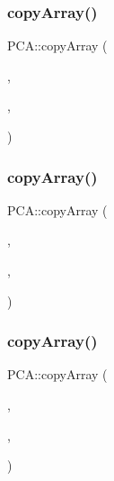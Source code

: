 \hypertarget{namespace_p_c_a_a2b9aa130e94cb88875159aaf23ff8dfb}{}\label{namespace_p_c_a_a2b9aa130e94cb88875159aaf23ff8dfb} 
\subsubsection{\texorpdfstring{copy\+Array()}{copyArray()}\hspace{0.1cm}{\footnotesize\ttfamily [5/8]}}
{\footnotesize\ttfamily P\+C\+A\+::copy\+Array (\begin{DoxyParamCaption}\item[{num\+Sites}]{,  }\item[{\hyperlink{namespace_p_c_a_abf43edb3e63963e603bf8c8ce20abf94}{d}}]{,  }\item[{d\+\_\+in}]{ }\end{DoxyParamCaption})}

\hypertarget{namespace_p_c_a_a3ab4fdf7f49322cf707b5d1977c87913}{}\label{namespace_p_c_a_a3ab4fdf7f49322cf707b5d1977c87913} 
\subsubsection{\texorpdfstring{copy\+Array()}{copyArray()}\hspace{0.1cm}{\footnotesize\ttfamily [6/8]}}
{\footnotesize\ttfamily P\+C\+A\+::copy\+Array (\begin{DoxyParamCaption}\item[{num\+Sites}]{,  }\item[{\hyperlink{namespace_p_c_a_a7ba252167ecbbceaa608cd406810aa1f}{a}}]{,  }\item[{a\+\_\+in}]{ }\end{DoxyParamCaption})}

\hypertarget{namespace_p_c_a_a5a7531f7aeee8b958633285e7ae8ebab}{}\label{namespace_p_c_a_a5a7531f7aeee8b958633285e7ae8ebab} 
\subsubsection{\texorpdfstring{copy\+Array()}{copyArray()}\hspace{0.1cm}{\footnotesize\ttfamily [7/8]}}
{\footnotesize\ttfamily P\+C\+A\+::copy\+Array (\begin{DoxyParamCaption}\item[{num\+Sites}]{,  }\item[{\hyperlink{namespace_p_c_a_a92ab50a62efb8eaa1bcd8e279828125b}{b}}]{,  }\item[{b\+\_\+in}]{ }\end{DoxyParamCaption})}

